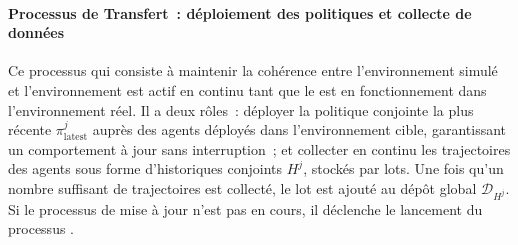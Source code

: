 \paragraph{Processus de Transfert~: déploiement des politiques et collecte de données}

Ce processus qui consiste à maintenir la cohérence entre l'environnement simulé et l'environnement est actif en continu tant que le  est en fonctionnement dans l'environnement réel. Il a deux rôles~: déployer la politique conjointe la plus récente $\pi^j_{\text{latest}}$ auprès des agents déployés dans l'environnement cible, garantissant un comportement à jour sans interruption~; et collecter en continu les trajectoires des agents sous forme d'historiques conjoints $H^j$, stockés par lots. Une fois qu'un nombre suffisant de trajectoires est collecté, le lot est ajouté au dépôt global $\mathcal{D}_{H^j}$. Si le processus de mise à jour n'est pas en cours, il déclenche le lancement du processus \textit{}.


